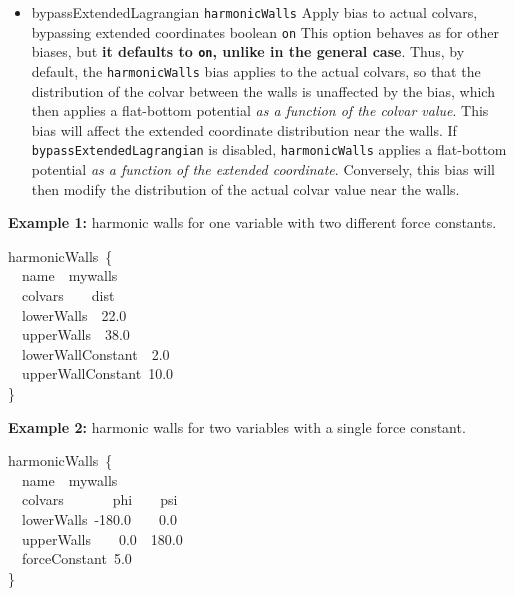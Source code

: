 \begin{itemize}
\item %
  \keydef
    {bypassExtendedLagrangian}{%
    \texttt{harmonicWalls}}{%
    Apply bias to actual colvars, bypassing extended coordinates}{%
    boolean}{%
    \texttt{on}}{%
    This option behaves as  for other biases,
    but \textbf{it defaults to \texttt{on}, unlike in the general case}.
    Thus, by default, the \texttt{harmonicWalls} bias applies to the actual colvars, so that the distribution of the colvar between the walls is unaffected by the bias, which then applies a flat-bottom potential \emph{as a function of the colvar value}. This bias will affect the extended coordinate distribution near the walls.
    If \texttt{bypassExtendedLagrangian} is disabled, \texttt{harmonicWalls} applies a flat-bottom potential \emph{as a function of the extended coordinate}. Conversely, this bias will then modify the distribution of the actual colvar value near the walls.}

\end{itemize}

\noindent\textbf{Example 1:} harmonic walls for one variable with two different force constants.
\begin{cvexampleinput}
\-harmonicWalls~\{\\
\-\-~~name~~mywalls\\
\-\-~~colvars~~~~dist\\
\-\-~~lowerWalls~~22.0~\\
\-\-~~upperWalls~~38.0~\\
\-\-~~lowerWallConstant~~2.0~\\
\-\-~~upperWallConstant~10.0~\\
\-\}
\end{cvexampleinput}

\noindent\textbf{Example 2:} harmonic walls for two variables with a single force constant.
\begin{cvexampleinput}
\-harmonicWalls~\{\\
\-\-~~name~~mywalls\\
\-\-~~colvars~~~~~~~phi~~~~psi\\
\-\-~~lowerWalls~-180.0~~~~0.0\\
\-\-~~upperWalls~~~~0.0~~180.0\\
\-\-~~forceConstant~5.0~\\
\-\}
\end{cvexampleinput}




